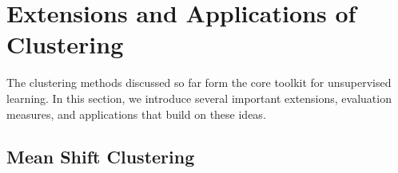\documentclass{article}
\begin{document}

\section{Extensions and Applications of Clustering}

The clustering methods discussed so far form the core toolkit for unsupervised learning. 
In this section, we introduce several important extensions, evaluation measures, and 
applications that build on these ideas.

\subsection{Mean Shift Clustering}
\end{document}
